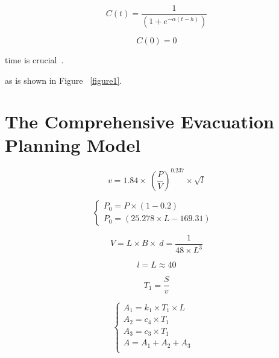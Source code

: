 \documentclass{mcmthesis}
\begin{document}
\begin{equation}\label{1}
C(t) = \frac{1}{{(1 + {e^{ - \alpha (t - h)}})}}
\end{equation}

\begin{equation}\label{2}
C(0) = 0
\end{equation}



time is crucial~\cite{Sayyady2010Optimizing,So2010Managing}.



as is shown in Figure ~\ref{figure1}.



\section{The Comprehensive Evacuation Planning Model}

\begin{equation}\label{1}
v=1.84\times \ (\frac{P}{V}) ^{0.237} \times \sqrt{l}
\end{equation}

\begin{equation}
\left\{
\begin{array}{lr}
P_0=P \times (1-0.2) &\\
P_0=(25.278\times L -169.31)
\end{array}
\right.
\end{equation}



\begin{equation}\label{3}
V=L\times B\times\ d =\frac{1}{48\times L^3}
\end{equation}

\begin{equation}\label{4}
l=L\approx 40
\end{equation}

\begin{equation}\label{4}
T_1=\frac{S}{v}
\end{equation}


			\begin{equation}
			\left\{
			\begin{array}{lr}

A_1=k_1 \times T_1\times L  &\\
A_2=c_4  \times T_1  &\\
A_3=c_3  \times T_1 &\\
A=A_1+A_2+A_3 \\		
			\end{array}
			\right.
			\end{equation}
\end{document}
